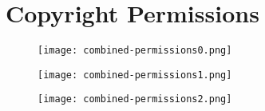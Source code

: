 \chapter{Copyright Permissions}

\begin{figure}[H]
  \centering
  \texttt{[image: combined-permissions0.png]}
\end{figure}
\begin{figure}[H]
  \centering
  \texttt{[image: combined-permissions1.png]}
\end{figure}  
\begin{figure}[H]
  \centering
  \texttt{[image: combined-permissions2.png]}
\end{figure}
